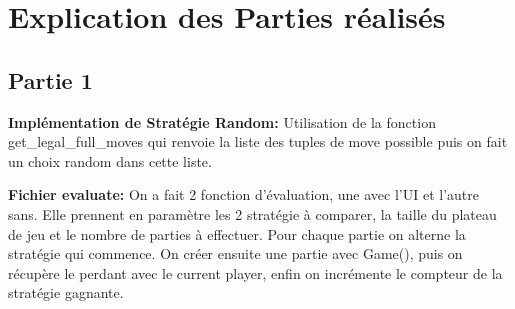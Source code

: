 \documentclass{article}
\begin{document}
	
	\section{Explication des Parties réalisés}
	
	\subsection{Partie 1}
	
	
	\textbf{Implémentation de Stratégie Random:}
	Utilisation de la fonction get\_legal\_full\_moves qui renvoie la liste des tuples de move possible puis on fait un choix random dans cette liste.
	
	\noindent\textbf{Fichier evaluate:} On a fait 2 fonction d'évaluation, une avec l'UI et l'autre sans. Elle prennent en paramètre les 2 stratégie à comparer, la taille du plateau de jeu et le nombre de parties à effectuer. Pour chaque partie on alterne la stratégie qui commence. On créer ensuite une partie avec Game(), puis on récupère le perdant avec le current player, enfin on incrémente le compteur de la stratégie gagnante.
	
	
	
	
\end{document}
